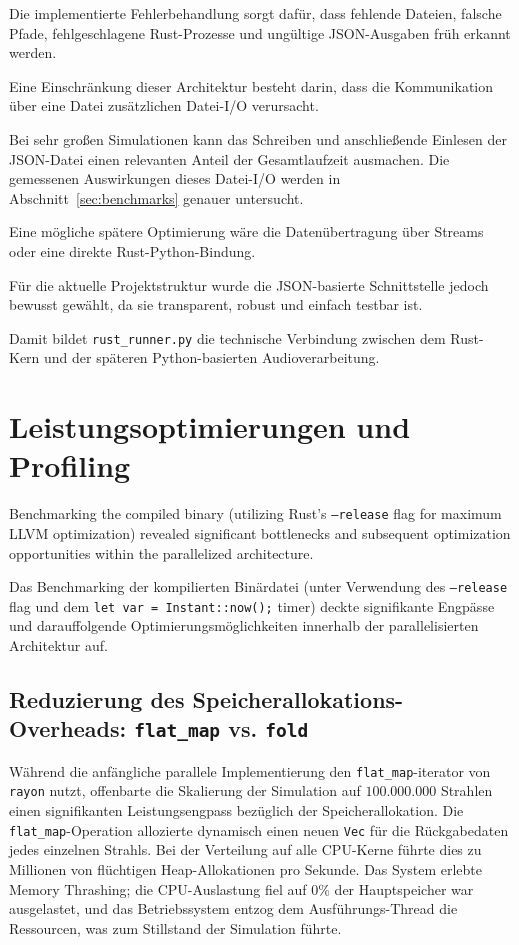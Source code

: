 \documentclass{article}
\begin{document}
    Die implementierte Fehlerbehandlung sorgt dafür, dass fehlende Dateien,
    falsche Pfade, fehlgeschlagene Rust-Prozesse und ungültige JSON-Ausgaben früh
    erkannt werden.

    Eine Einschränkung dieser Architektur besteht darin, dass die Kommunikation
    über eine Datei zusätzlichen Datei-I/O verursacht.

    Bei sehr großen Simulationen kann das Schreiben und anschließende Einlesen der
    JSON-Datei einen relevanten Anteil der Gesamtlaufzeit ausmachen. Die gemessenen
    Auswirkungen dieses Datei-I/O werden in
    Abschnitt~\ref{sec:benchmarks} genauer untersucht.

    Eine mögliche spätere Optimierung wäre die Datenübertragung über Streams oder
    eine direkte Rust-Python-Bindung.

    Für die aktuelle Projektstruktur wurde die JSON-basierte Schnittstelle jedoch
    bewusst gewählt, da sie transparent, robust und einfach testbar ist.

    Damit bildet \texttt{rust\_runner.py} die technische Verbindung zwischen dem
    Rust-Kern und der späteren Python-basierten Audioverarbeitung.


    \section{Leistungsoptimierungen und Profiling}
    \label{sec:optimizations}
    Benchmarking the compiled binary (utilizing Rust's \texttt{--release} flag for maximum LLVM optimization)
    revealed significant bottlenecks and subsequent optimization opportunities within the parallelized architecture.

    Das Benchmarking der kompilierten Binärdatei (unter Verwendung des \texttt{--release} flag und dem \texttt{let var = Instant::now();} timer) deckte signifikante
    Engpässe und darauffolgende Optimierungsmöglichkeiten innerhalb der parallelisierten Architektur auf.

    \subsection{Reduzierung des Speicherallokations-Overheads: \texttt{flat\_map} vs. \texttt{fold}}
    \label{sec:memory_overhead}


    Während die anfängliche parallele Implementierung den \texttt{flat\_map}-iterator von \texttt{rayon} nutzt, offenbarte die Skalierung der Simulation auf $100.000.000$ Strahlen einen
    signifikanten Leistungsengpass bezüglich der Speicherallokation.
    Die \texttt{flat\_map}-Operation allozierte dynamisch einen neuen \texttt{Vec} für die Rückgabedaten jedes einzelnen Strahls.
    Bei der Verteilung auf alle CPU-Kerne führte dies zu Millionen von flüchtigen Heap-Allokationen pro Sekunde.
    Das System erlebte Memory Thrashing; die CPU-Auslastung fiel auf 0\% der Hauptspeicher war ausgelastet, und das Betriebssystem entzog dem Ausführungs-Thread die Ressourcen,
    was zum Stillstand der Simulation führte.
\end{document}
